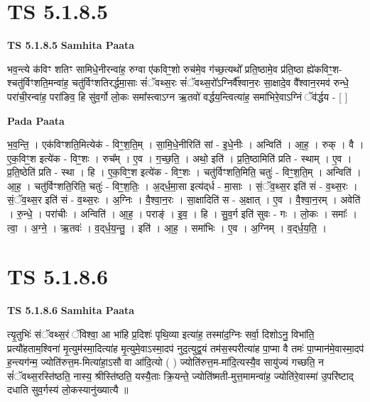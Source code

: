 \documentclass[17pt]{extarticle}
\begin{document}

\section{ TS 5.1.8.5 }

\textbf{TS 5.1.8.5 } \newline
\textbf{Samhita Paata} \newline

भव॒न्त्ये क॑विꣳ शतिꣳ सामिधे॒नीरन्वा॑ह॒ रुग्वा ए॑कविꣳ॒॒शो रुच॑मे॒व ग॑च्छ॒त्यथो᳚ प्रति॒ष्ठामे॒व प्र॑ति॒ष्ठा ह्ये॑कविꣳ॒॒श-श्चतु॑र्विꣳशति॒मन्वा॑ह॒ चतु॑र्विꣳशतिरर्द्धमा॒साः सं॑ॅवथ्स॒रः सं॑ॅवथ्स॒रो᳚ऽग्निर्वै᳚श्वान॒रः सा॒क्षादे॒व वै᳚श्वान॒रमव॑ रुन्धे॒ परा॑ची॒रन्वा॑ह॒ परा॑ङिव॒ हि सु॑व॒र्गो लो॒कः समा᳚स्त्वाऽग्न ऋ॒तवो॑ वर्द्धय॒न्त्वित्या॑ह॒ समा॑भिरे॒वाऽग्निं ॅव॑र्द्धय - [  ] \newline

\textbf{Pada Paata} \newline

भ॒व॒न्ति॒ । एक॑विꣳशति॒मित्येक॑ - विꣳ॒॒श॒ति॒म् । सा॒मि॒धे॒नीरिति॑ सां - इ॒धे॒नीः । अन्विति॑ । आ॒ह॒ । रुक् । वै । ए॒क॒विꣳ॒॒श इत्ये॑क - विꣳ॒॒शः । रुच᳚म् । ए॒व । ग॒च्छ॒ति॒ । अथो॒ इति॑ । प्र॒ति॒ष्ठामिति॑ प्रति - स्थाम् । ए॒व । प्र॒ति॒ष्ठेति॑ प्रति - स्था । हि । ए॒क॒विꣳ॒॒श इत्ये॑क - विꣳ॒॒शः । चतु॑र्विꣳशति॒मिति॒ चतुः॑ - विꣳ॒॒श॒ति॒म् । अन्विति॑ । आ॒ह॒ । चतु॑र्विꣳशति॒रिति॒ चतुः॑ - विꣳ॒॒श॒तिः॒ । अ॒द्‌र्ध॒मा॒सा इत्य॑द्‌र्ध - मा॒साः । सं॒ॅव॒थ्स॒र इति॑ सं - व॒थ्स॒रः । सं॒ॅव॒थ्स॒र इति॑ सं - व॒थ्स॒रः । अ॒ग्निः । वै॒श्वा॒न॒रः । सा॒क्षादिति॑ स - अ॒क्षात् । ए॒व । वै॒श्वा॒न॒रम् । अवेति॑ । रु॒न्धे॒ । परा॑चीः । अन्विति॑ । आ॒ह॒ । पराङ्॑ । इ॒व॒ । हि । सु॒व॒र्ग इति॑ सुवः - गः । लो॒कः । समाः᳚ । त्वा॒ । अ॒ग्ने॒ । ऋ॒तवः॑ । व॒द्‌र्ध॒य॒न्तु॒ । इति॑ । आ॒ह॒ । समा॑भिः । ए॒व । अ॒ग्निम् । व॒द्‌र्ध॒य॒ति॒ ।  \newline





\section{ TS 5.1.8.6 }

\textbf{TS 5.1.8.6 } \newline
\textbf{Samhita Paata} \newline

त्यृ॒तुभिः॑ संॅवथ्स॒रं ॅविश्वा॒ आ भा॑हि प्र॒दिशः॑ पृथि॒व्या इत्या॑ह॒ तस्मा॑द॒ग्निः सर्वा॒ दिशोऽनु॒ विभा॑ति॒ प्रत्यौ॑हताम॒श्विना॑ मृ॒त्युम॑स्मा॒दित्या॑ह मृ॒त्युमे॒वाऽस्मा॒दप॑ नुद॒त्युद्व॒यं तम॑स॒स्परीत्या॑ह पा॒प्मा वै तमः॑ पा॒प्मान॑मे॒वास्मा॒दप॑ ह॒न्त्यग॑न्म॒ ज्योति॑रुत्त॒म-मित्या॑हा॒ऽसौ वा आ॑दि॒त्यो ( ) ज्योति॑रुत्त॒म-मा॑दि॒त्यस्यै॒व सायु॑ज्यं गच्छति॒ न सं॑ॅवथ्स॒रस्ति॑ष्ठति॒ नास्य॒ श्रीस्ति॑ष्ठति॒ यस्यै॒ताः क्रि॒यन्ते॒ ज्योति॑ष्मती-मुत्त॒मामन्वा॑ह॒ ज्योति॑रे॒वास्मा॑ उ॒परि॑ष्टाद् दधाति सुव॒र्गस्य॑ लो॒कस्यानु॑ख्यात्यै ॥ \newline
\end{document}
